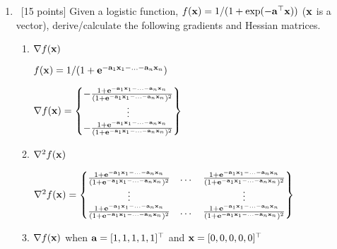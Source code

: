 \documentclass[12pt, fullpage,letterpaper]{article}
\begin{document}
\begin{enumerate}

\item~[15 points] Given a logistic function, $f({\bf x}) = 1/(1+\exp(-{\bf a}^\top {\bf x}))$ (${\bf x}$ is a vector), derive/calculate the following gradients and Hessian matrices.  
\begin{enumerate}
\item $\nabla f({\bf x})$

$f({\bf x}) = 1/(1+{\bf e}^{-{\bf a}_1{\bf x}_1 - ... - {\bf a}_n{\bf x}_n})$

$\nabla f({\bf x}) =
\begin{Bmatrix}
	-\frac{1+{\bf e}^{-{\bf a}_1{\bf x}_1 - ... - {\bf a}_n{\bf x}_n}}{(1+{\bf e}^{-{\bf a}_1{\bf x}_1 - ... - {\bf a}_n{\bf x}_n})^2} \\
	\vdots \\
	-\frac{1+{\bf e}^{-{\bf a}_1{\bf x}_1 - ... - {\bf a}_n{\bf x}_n}}{(1+{\bf e}^{-{\bf a}_1{\bf x}_1 - ... - {\bf a}_n{\bf x}_n})^2} \\
\end{Bmatrix}$

\item $\nabla^2 f({\bf x})$

$
\nabla^2 f({\bf x}) = 
\begin{Bmatrix}
	\frac{1+{\bf e}^{-{\bf a}_1{\bf x}_1 - ... - {\bf a}_n{\bf x}_n}}{(1+{\bf e}^{-{\bf a}_1{\bf x}_1 - ... - {\bf a}_n{\bf x}_n})^2} & \dots &  \frac{1+{\bf e}^{-{\bf a}_1{\bf x}_1 - ... - {\bf a}_n{\bf x}_n}}{(1+{\bf e}^{-{\bf a}_1{\bf x}_1 - ... - {\bf a}_n{\bf x}_n})^2} \\
	\vdots & & \vdots\\
	\frac{1+{\bf e}^{-{\bf a}_1{\bf x}_1 - ... - {\bf a}_n{\bf x}_n}}{(1+{\bf e}^{-{\bf a}_1{\bf x}_1 - ... - {\bf a}_n{\bf x}_n})^2} & \dots & \frac{1+{\bf e}^{-{\bf a}_1{\bf x}_1 - ... - {\bf a}_n{\bf x}_n}}{(1+{\bf e}^{-{\bf a}_1{\bf x}_1 - ... - {\bf a}_n{\bf x}_n})^2}\\
\end{Bmatrix}
$

\item $\nabla f({\bf x})$ when ${\bf a} = [1,1,1,1,1]^\top$ and ${\bf x} = [0,0,0,0,0]^\top$


\end{enumerate}
\end{enumerate}
\end{document}
